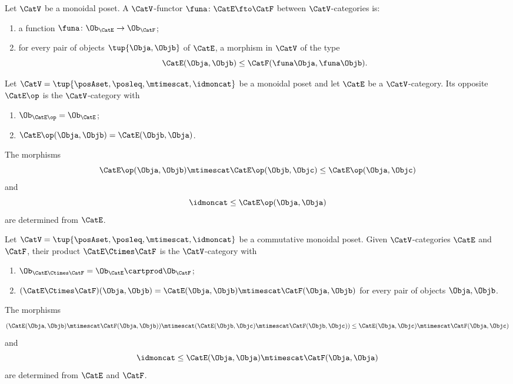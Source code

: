 \begin{ctdefinition}
\label{def:functor-monoidal-poset-enriched}
Let $\CatV$ be a monoidal poset. A $\CatV$-functor $\funa \colon \CatE \fto \CatF$ between $\CatV$-categories is:

\constit
\begin{enumerate}
\item a function $\funa \colon \Ob_\CatE \to \Ob_\CatF$;
\item for every pair of objects $\tup{\Obja, \Objb}$ of $\CatE$, a morphism in $\CatV$ of the type
\begin{equation}
\CatE(\Obja, \Objb) \leq \CatF(\funa \Obja, \funa \Objb). 
\end{equation}
\end{enumerate}
\end{ctdefinition}


\begin{ctdefinition}
\label{def:monoidal-poset-cat-op}
Let $\CatV = \tup{\posAset, \posleq, \mtimescat, \idmoncat}$ be a monoidal poset and let $\CatE$ be a $\CatV$-category. Its opposite $\CatE\op$ is the $\CatV$-category with 
\begin{enumerate}
\item $\Ob_{\CatE\op} = \Ob_\CatE$;
\item $\CatE\op(\Obja, \Objb) = \CatE(\Objb, \Obja)$.
\end{enumerate}

The morphisms 
\begin{equation}
\CatE\op(\Obja, \Objb) \mtimescat \CatE\op(\Objb, \Objc) \leq \CatE\op(\Obja, \Objc)
\end{equation}
and
\begin{equation}
\idmoncat \leq \CatE\op(\Obja, \Obja)
\end{equation}
are determined from $\CatE$.
\end{ctdefinition}

\begin{ctdefinition}
\label{def:monoidal-poset-cat-product}
Let $\CatV = \tup{\posAset, \posleq, \mtimescat, \idmoncat}$ be a commutative monoidal poset. Given $\CatV$-categories $\CatE$ and $\CatF$, their product $\CatE \Ctimes \CatF$ is the $\CatV$-category with 
\begin{enumerate}
\item $\Ob_{\CatE \Ctimes \CatF} = \Ob_\CatE \cartprod \Ob_\CatF$;
\item $(\CatE \Ctimes \CatF)(\Obja, \Objb) = \CatE (\Obja, \Objb) \mtimescat \CatF (\Obja, \Objb)$ for every pair of objects $\Obja, \Objb$. 
\end{enumerate}
The morphisms 
\begin{equation}
(\CatE(\Obja, \Objb) \mtimescat \CatF(\Obja, \Objb)) \mtimescat (\CatE(\Objb, \Objc) \mtimescat \CatF(\Objb, \Objc)) \leq \CatE(\Obja, \Objc) \mtimescat  \CatF(\Obja, \Objc)
\end{equation}
and
\begin{equation}
\idmoncat \leq \CatE(\Obja, \Obja) \mtimescat \CatF(\Obja, \Obja)
\end{equation}
are determined from $\CatE$ and $\CatF$.
\end{ctdefinition}



